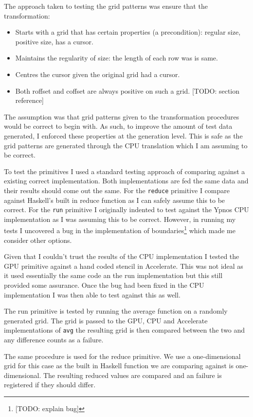 The approach taken to testing the grid patterns was ensure that the
transformation:

\begin{itemize}
\itemsep1pt\parskip0pt
\item
  Starts with a grid that has certain properties (a precondition):
  regular size, positive size, has a cursor.
\item
  Maintains the regularity of size: the length of each row was is same.
\item
  Centres the cursor given the original grid had a cursor.
\item
  Both roffset and coffset are always positive on such a grid. {[}TODO:
  section reference{]}
\end{itemize}

The assumption was that grid patterns given to the transformation
procedures would be correct to begin with. As such, to improve the
amount of test data generated, I enforced these properties at the
generation level. This is safe as the grid patterns are generated
through the CPU translation which I am assuming to be correct.

To test the primitives I used a standard testing approach of comparing
against a existing correct implementation. Both implementations are fed
the same data and their results should come out the same. For the
\texttt{reduce} primitive I compare against Haskell's built in reduce
function as I can safely assume this to be correct. For the \texttt{run}
primitive I originally indented to test against the Ypnos CPU
implementation as I was assuming this to be correct. However, in running
my tests I uncovered a bug in the implementation of boundaries\footnote{{[}TODO:
  explain bug{]}} which made me consider other options.

Given that I couldn't trust the results of the CPU implementation I
tested the GPU primitive against a hand coded stencil in Accelerate.
This was not ideal as it used essentially the same code an the run
implementation but this still provided some assurance. Once the bug had
been fixed in the CPU implementation I was then able to test against
this as well.

The run primitive is tested by running the average function on a
randomly generated grid. The grid is passed to the GPU, CPU and
Accelerate implementations of \texttt{avg} the resulting grid is then
compared between the two and any difference counts as a failure.

The same procedure is used for the reduce primitive. We use a
one-dimensional grid for this case as the built in Haskell function we
are comparing against is one-dimensional. The resulting reduced values
are compared and an failure is registered if they should differ.

